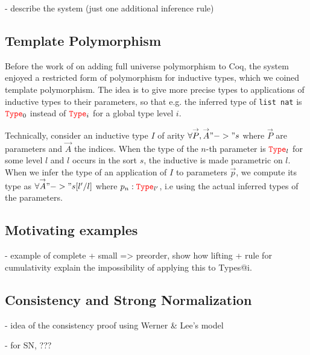 \documentclass{easychair}
\newcommand{\Type}[1]{{\color{red} \mathtt{Type}}_{#1}}
\begin{document}
\def\vec#1{\overset{\rightarrow}{#1}}



- describe the system (just one additional inference rule)

\subsection*{Template Polymorphism}

Before the work of \cite{SozeauT14} on adding full universe polymorphism
to Coq, the system enjoyed a restricted form of polymorphism for
inductive types, which we coined template polymorphism. The idea is to
give more precise types to applications of inductive types to their
parameters, so that e.g. the inferred type of \texttt{list nat} is
$\Type{0}$ instead of $\Type{i}$ for a global type level $i$.

Technically, consider an inductive type $I$ of arity
$\forall \vec{P}, \vec{A} "->" s$ where $\vec{P}$ are parameters and
$\vec{A}$ the indices.  When the type of the $n$-th parameter is
$\Type{l}$ for some level $l$ and $l$ occurs in the sort $s$, the
inductive is made parametric on $l$. When we infer the type of an
application of $I$ to parameters $\vec{p}$, we compute its type as
$\forall \vec{A} "->" s[l'/l]$ where $p_n : \Type{l'}$, i.e using the
actual inferred types of the parameters.


\subsection*{Motivating examples}

- example of complete + small => preorder, show how lifting + rule for
cumulativity explain the impossibility of applying this to Types@{i}.

\subsection*{Consistency and Strong Normalization}
- idea of the consistency proof using Werner \& Lee's model

- for SN, ???



\end{document}
